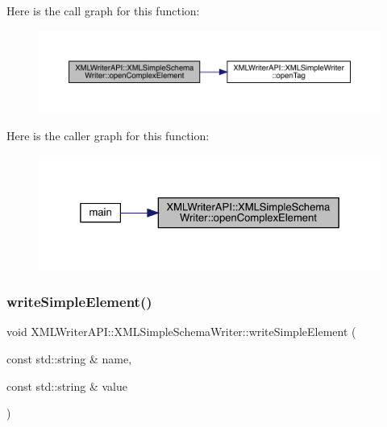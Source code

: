 Here is the call graph for this function\+:
\nopagebreak
\begin{figure}[H]
\begin{center}
\leavevmode
\includegraphics[width=350pt]{db/d0b/classXMLWriterAPI_1_1XMLSimpleSchemaWriter_a136a57c1860b0baa0fd6b877f4dce4bc_cgraph}
\end{center}
\end{figure}
Here is the caller graph for this function\+:
\nopagebreak
\begin{figure}[H]
\begin{center}
\leavevmode
\includegraphics[width=325pt]{db/d0b/classXMLWriterAPI_1_1XMLSimpleSchemaWriter_a136a57c1860b0baa0fd6b877f4dce4bc_icgraph}
\end{center}
\end{figure}
\mbox{\label{classXMLWriterAPI_1_1XMLSimpleSchemaWriter_a312669330ac26b8849f671ea23ea60de}} 
\subsubsection{\texorpdfstring{writeSimpleElement()}{writeSimpleElement()}\hspace{0.1cm}{\footnotesize\ttfamily [1/30]}}
{\footnotesize\ttfamily void X\+M\+L\+Writer\+A\+P\+I\+::\+X\+M\+L\+Simple\+Schema\+Writer\+::write\+Simple\+Element (\begin{DoxyParamCaption}\item[{const std\+::string \&}]{name,  }\item[{const std\+::string \&}]{value }\end{DoxyParamCaption})\hspace{0.3cm}{\ttfamily [inline]}}

